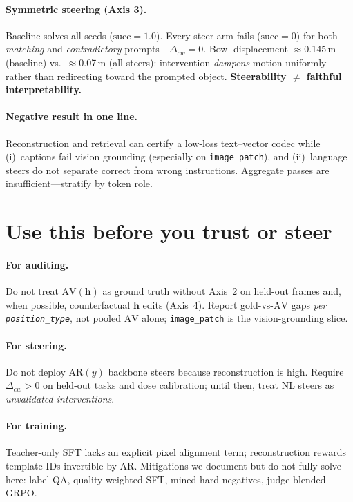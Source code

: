 \documentclass[10pt]{article}
\newcommand{\AV}{\ensuremath{\mathrm{AV}}}
\newcommand{\AR}{\ensuremath{\mathrm{AR}}}
\newcommand{\hvec}{\mathbf{h}}
\newcommand{\code}[1]{\texttt{\small #1}}
\begin{document}
\paragraph{Symmetric steering (Axis 3).}
Baseline solves all seeds (\(\mathrm{succ}=1.0\)).
Every steer arm fails (\(\mathrm{succ}=0\)) for both \emph{matching} and
\emph{contradictory} prompts---\(\Delta_{cw}=0\).
Bowl displacement $\approx$0.145\,m (baseline) vs.\ $\approx$0.07\,m (all
steers): intervention \emph{dampens} motion uniformly rather than redirecting
toward the prompted object.
\textbf{Steerability \(\neq\) faithful interpretability.}

\paragraph{Negative result in one line.}
Reconstruction and retrieval can certify a low-loss text--vector codec
while (i)~captions fail vision grounding (especially on \code{image\_patch}),
and (ii)~language steers do not separate correct from wrong instructions.
Aggregate passes are insufficient---stratify by token role.

\section{Use this before you trust or steer}
\label{sec:conclusion}

\paragraph{For auditing.}
Do not treat \(\AV(\hvec)\) as ground truth without Axis~2 on held-out
frames and, when possible, counterfactual \(\hvec\) edits (Axis~4).
Report gold-vs-\(\AV\) gaps \emph{per \code{position\_type}}, not pooled
\(\AV\) alone; \code{image\_patch} is the vision-grounding slice.

\paragraph{For steering.}
Do not deploy \(\AR(y)\) backbone steers because reconstruction is high.
Require \(\Delta_{cw} > 0\) on held-out tasks and dose calibration;
until then, treat NL steers as \emph{unvalidated interventions}.

\paragraph{For training.}
Teacher-only SFT lacks an explicit pixel alignment term; reconstruction
rewards template IDs invertible by \(\AR\).
Mitigations we document but do not fully solve here: label QA,
quality-weighted SFT, mined hard negatives, judge-blended GRPO.
\end{document}
